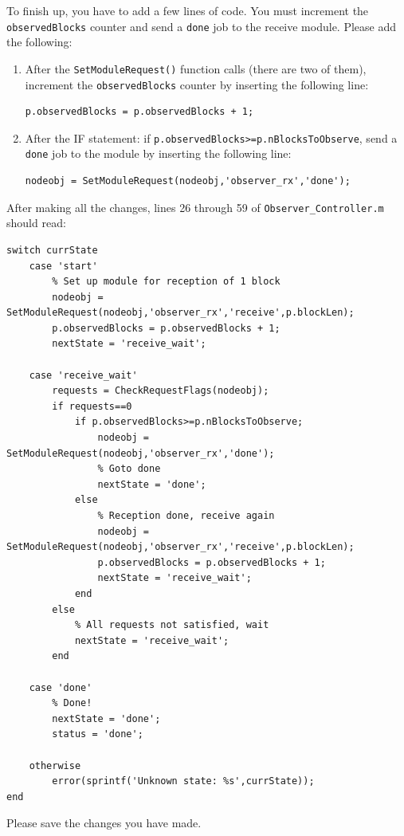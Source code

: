 To finish up, you have to add a few lines of code.  You must increment the \verb+observedBlocks+ counter and send a \verb+done+ job to the receive module.  Please add the following:
%
\setcounter{enumitemp}{\theenumi}
\begin{enumerate}
\setcounter{enumi}{\theenumitemp}
\item After the \verb+SetModuleRequest()+ function calls (there are two of them), increment the \verb+observedBlocks+ counter by inserting the following line:
%
\begin{lstlisting}[numbers=none]
p.observedBlocks = p.observedBlocks + 1;
\end{lstlisting}
%

\item After the IF statement: if \verb+p.observedBlocks>=p.nBlocksToObserve+, send a \verb+done+ job to the module by inserting the following line:
%
\begin{lstlisting}[numbers=none]
nodeobj = SetModuleRequest(nodeobj,'observer_rx','done');
\end{lstlisting}
%

\end{enumerate}
%
After making all the changes, lines 26 through 59 of \verb+Observer_Controller.m+ should read:
%
\begin{lstlisting}[firstnumber=26]
% State machine next-state and output "logic"
switch currState
    case 'start'
        % Set up module for reception of 1 block
        nodeobj = SetModuleRequest(nodeobj,'observer_rx','receive',p.blockLen);
        p.observedBlocks = p.observedBlocks + 1;
        nextState = 'receive_wait';

    case 'receive_wait'
        requests = CheckRequestFlags(nodeobj);
        if requests==0
            if p.observedBlocks>=p.nBlocksToObserve;
                nodeobj = SetModuleRequest(nodeobj,'observer_rx','done');
                % Goto done
                nextState = 'done';
            else
                % Reception done, receive again
                nodeobj = SetModuleRequest(nodeobj,'observer_rx','receive',p.blockLen);
                p.observedBlocks = p.observedBlocks + 1;
                nextState = 'receive_wait';
            end
        else
            % All requests not satisfied, wait
            nextState = 'receive_wait';
        end

    case 'done'
        % Done!
        nextState = 'done';
        status = 'done';

    otherwise
        error(sprintf('Unknown state: %s',currState));
end
\end{lstlisting}
%
Please save the changes you have made.

